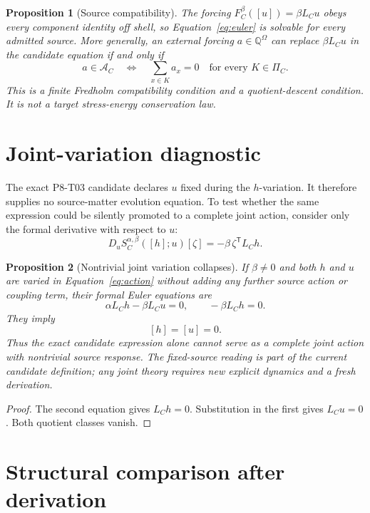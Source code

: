 \documentclass[11pt]{article}
\newtheorem{proposition}{Proposition}
\newcommand{\Q}{\mathbb Q}
\newcommand{\Aspace}{\mathcal A_C}
\begin{document}
\begin{proposition}[Source compatibility]
\label{prop:compatibility}
The forcing \(F_C^\beta([u])=\beta L_Cu\) obeys every component identity
off shell, so Equation~\eqref{eq:euler} is solvable for every admitted
source.  More generally, an external forcing \(a\in\Q^\Omega\) can replace
\(\beta L_Cu\) in the candidate equation if and only if
\[
 a\in\Aspace
 \quad\Longleftrightarrow\quad
 \sum_{x\in K}a_x=0\quad\text{for every }K\in\Pi_C.
\]
This is a finite Fredholm compatibility condition and a quotient-descent
condition.  It is not a target stress-energy conservation law.
\end{proposition}

\section{Joint-variation diagnostic}

The exact P8-T03 candidate declares \(u\) fixed during the \(h\)-variation.
It therefore supplies no source-matter evolution equation.  To test whether
the same expression could be silently promoted to a complete joint action,
consider only the formal derivative with respect to \(u\):
\begin{equation}
 D_uS_C^{\alpha,\beta}([h];u)[\zeta]
 =-\beta\,\zeta^{\mathsf T}L_Ch.
 \label{eq:uvariation}
\end{equation}

\begin{proposition}[Nontrivial joint variation collapses]
\label{prop:joint}
If \(\beta\ne0\) and both \(h\) and \(u\) are varied in
Equation~\eqref{eq:action} without adding any further source action or
coupling term, their formal Euler equations are
\[
 \alpha L_Ch-\beta L_Cu=0,
 \qquad
 -\beta L_Ch=0.
\]
They imply
\[
 [h]=[u]=0.
\]
Thus the exact candidate expression alone cannot serve as a complete joint
action with nontrivial source response.  The fixed-source reading is part of
the current candidate definition; any joint theory requires new explicit
dynamics and a fresh derivation.
\end{proposition}

\begin{proof}
The second equation gives \(L_Ch=0\).  Substitution in the first gives
\(L_Cu=0\).  Both quotient classes vanish.
\end{proof}

\section{Structural comparison after derivation}
\end{document}
